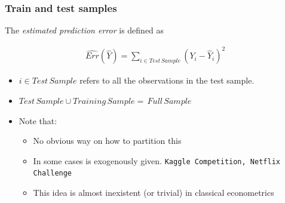 \documentclass[
  shownotes,
  xcolor={svgnames},
  hyperref={colorlinks,citecolor=DarkBlue,linkcolor=DarkRed,urlcolor=DarkBlue}
  ]{beamer}
\begin{document}
\begin{frame}
\frametitle{Train and test samples}


The \emph{estimated prediction error} is defined as

\begin{align}
\hat{Err}(\hat Y) = \sum_{i \in Test\,Sample} \left(Y_i - \hat Y_i \right)^2
\end{align}

\begin{itemize}
  \item $i \in Test\,Sample$ refers to all the observations in the test sample. 
  \item $Test\,Sample \cup Training\,Sample = \,Full\,Sample$
  \bigskip
  \item Note that:
  \begin{itemize}
    \item No obvious way on how to partition this
    \item In some cases is exogenously given. \texttt{Kaggle Competition, Netflix Challenge}
    \item This idea is almost inexistent (or trivial) in classical econometrics
  \end{itemize}  

\end{itemize}




\end{frame}
\end{document}
